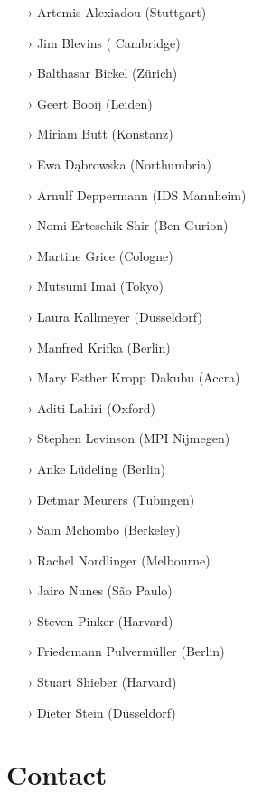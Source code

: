 \documentclass[
notumble,
nofoldmark,
]{leaflet}
\begin{document}
\begin{itemize}
\setlength{\itemsep}{-3pt} 
 \item[›] Artemis Alexiadou (Stuttgart)
 \item[›] Jim Blevins ( Cambridge)
 \item[›] Balthasar Bickel (Z\"urich)
 \item[›] Geert Booij (Leiden)
 \item[›] Miriam Butt (Konstanz)
 \item[›] Ewa D\k{a}browska (Northumbria)
 \item[›] Arnulf Deppermann (IDS Mannheim)
 \item[›] Nomi Erteschik-Shir (Ben Gurion)
 \item[›] Martine Grice (Cologne)
 \item[›] Mutsumi Imai (Tokyo)
 \item[›] Laura Kallmeyer (D\"usseldorf)
 \item[›] Manfred Krifka (Berlin)
 \item[›] Mary Esther Kropp Dakubu (Accra)
 \item[›] Aditi Lahiri (Oxford)
 \item[›] Stephen Levinson (MPI Nijmegen)
 \item[›] Anke L\"udeling (Berlin)
 \item[›] Detmar Meurers (T\"ubingen)
 \item[›] Sam Mchombo (Berkeley)
 \item[›] Rachel Nordlinger (Melbourne)
 \item[›] Jairo Nunes (S\~ao Paulo)
 \item[›] Steven Pinker (Harvard)
 \item[›] Friedemann Pulverm\"uller (Berlin)
 \item[›] Stuart Shieber (Harvard)
 \item[›] Dieter Stein (D\"usseldorf)  
\end{itemize}

\section{\sffamily\Large\bfseries Contact}  
\end{document}
